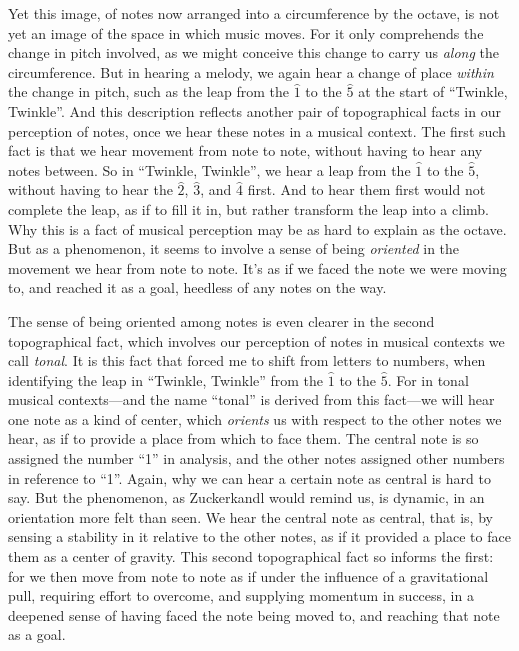 \documentclass[12pt]{memoir}
\begin{document}
Yet this image, of notes now arranged into a
circumference by the octave, is not yet an
image of the space in which music moves. For it
only comprehends the change in pitch involved,
as we might conceive this change to carry us
\emph{along} the circumference. But in hearing a
melody, we again hear 
a change of place \emph{within} the change in
pitch, such as the leap from the $\hat{1}$ to the
$\hat{5}$ at the start of ``Twinkle, Twinkle''.
And this description reflects another pair of
topographical facts in our perception of notes,
once we hear these notes in a musical context.
The first such fact is that we hear movement from
note to note, without having to hear any notes
between. So in ``Twinkle, Twinkle'', we hear a
leap from the $\hat{1}$ to the $\hat{5}$, without
having to hear the $\hat{2}$, $\hat{3}$, and
$\hat{4}$ first. And to hear them first would
not complete the leap, as if to fill it in, but
rather transform the leap into a climb. Why this
is a fact of musical perception may be as hard to
explain as the octave. But as a phenomenon, it
seems to involve a sense of being \emph{oriented}
in the movement we hear from note to note. It's 
as if we faced the note we were moving to, and
reached it as a goal, heedless of any notes on the
way.

The sense of being oriented among notes is even
clearer in the second topographical fact, which
involves our perception of notes in musical
contexts we call \emph{tonal}. It is this fact
that forced me to shift from letters to numbers,
when identifying the leap in ``Twinkle, Twinkle''
from the $\hat{1}$ to the $\hat{5}$. For in tonal
musical contexts---and the name ``tonal'' is
derived from this fact---we will hear one note as
a kind of center, which \emph{orients} us with
respect to the other notes we hear, as if to
provide a place from which to face them. The
central note is so assigned the number ``1'' in
analysis, and the other notes assigned other
numbers in reference to ``1''. Again, why we can
hear a certain note as central is hard to say. But
the phenomenon, as Zuckerkandl would remind us, is
dynamic, in an orientation more felt than seen. We
hear the central note as central, that is, by
sensing a stability in it relative to the other
notes, as if it provided a place to face them as a
center of gravity. This second topographical fact
so informs the first: for we then move from note
to note as if under the influence of a
gravitational pull, requiring effort to overcome,
and supplying momentum in success, in a deepened
sense of having faced the note being moved to, and
reaching that note as a goal.
\end{document}
